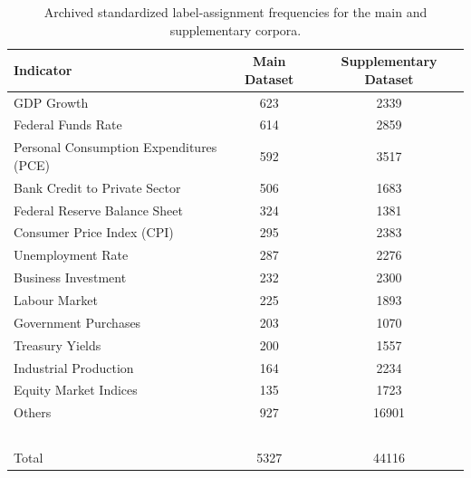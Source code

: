 \begin{table}[htbp]
\centering
\footnotesize
\setlength{\tabcolsep}{5pt}
\begin{tabular}{lcc}
\toprule
\textbf{Indicator} & \textbf{Main Dataset} & \textbf{Supplementary Dataset} \\
\hline
GDP Growth & 623 & 2339 \\
Federal Funds Rate & 614 & 2859 \\
Personal Consumption Expenditures (PCE) & 592 & 3517 \\
Bank Credit to Private Sector & 506 & 1683 \\
Federal Reserve Balance Sheet & 324 & 1381 \\
Consumer Price Index (CPI) & 295 & 2383 \\
Unemployment Rate & 287 & 2276 \\
Business Investment & 232 & 2300 \\
Labour Market & 225 & 1893 \\
Government Purchases & 203 & 1070 \\
Treasury Yields & 200 & 1557 \\
Industrial Production & 164 & 2234 \\
Equity Market Indices & 135 & 1723 \\
Others & 927 & 16901 \\
\midrule
~\\
Total & 5327 & 44116 \\
\bottomrule
\end{tabular}
\caption{Archived standardized label-assignment frequencies for the main and supplementary corpora.}
\label{tab:ch2:indicator_count}
\end{table}




